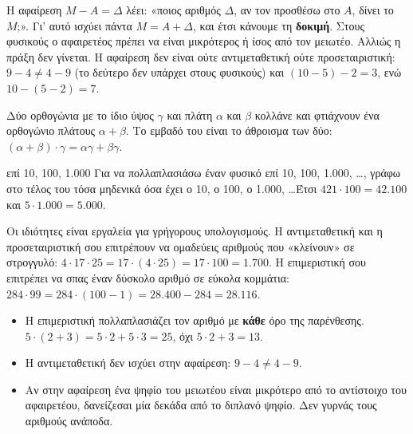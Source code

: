 
Η αφαίρεση $Μ-Α=\Delta$ λέει: «ποιος αριθμός $\Delta$, αν τον προσθέσω στο $Α$, δίνει το $Μ$;». Γι' αυτό ισχύει πάντα $Μ=Α+\Delta$, και έτσι κάνουμε τη \textbf{δοκιμή}. Στους φυσικούς ο αφαιρετέος πρέπει να είναι μικρότερος ή ίσος από τον μειωτέο. Αλλιώς η πράξη δεν γίνεται. Η αφαίρεση δεν είναι ούτε αντιμεταθετική ούτε προσεταιριστική: $9-4\neq 4-9$ (το δεύτερο δεν υπάρχει στους φυσικούς) και $(10-5)-2=3$, ενώ $10-(5-2)=7$.


Δύο ορθογώνια με το ίδιο ύψος $\gamma$ και πλάτη $\alpha$ και $\beta$ κολλάνε και φτιάχνουν ένα ορθογώνιο πλάτους $\alpha+\beta$. Το εμβαδό του είναι το άθροισμα των δύο: $(\alpha+\beta)\cdot\gamma=\alpha\gamma+\beta\gamma$.

\begin{center}
\end{center}


\begin{kanonas}{επί 10, 100, 1.000}
Για να πολλαπλασιάσω έναν φυσικό επί 10, 100, 1.000, \dots, γράφω στο τέλος του τόσα μηδενικά όσα έχει ο 10, ο 100, ο 1.000, \dots Έτσι $421\cdot 100=42.100$ και $5\cdot 1.000=5.000$.
\end{kanonas}


Οι ιδιότητες είναι εργαλεία για γρήγορους υπολογισμούς. Η αντιμεταθετική και η προσεταιριστική σου επιτρέπουν να ομαδεύεις αριθμούς που «κλείνουν» σε στρογγυλό: $4\cdot 17\cdot 25=17\cdot(4\cdot 25)=17\cdot 100=1.700$. Η επιμεριστική σου επιτρέπει να σπας έναν δύσκολο αριθμό σε εύκολα κομμάτια: $284\cdot 99=284\cdot(100-1)=28.400-284=28.116$.

\begin{prosoxi}
\begin{itemize}[leftmargin=1.2em,itemsep=0.3ex,topsep=2pt]
\item Η επιμεριστική πολλαπλασιάζει τον αριθμό με \textbf{κάθε} όρο της παρένθεσης. $5\cdot(2+3)=5\cdot 2+5\cdot 3=25$, όχι $5\cdot 2+3=13$.
\item Η αντιμεταθετική δεν ισχύει στην αφαίρεση: $9-4\neq 4-9$.
\item Αν στην αφαίρεση ένα ψηφίο του μειωτέου είναι μικρότερο από το αντίστοιχο του αφαιρετέου, δανείζεσαι μία δεκάδα από το διπλανό ψηφίο. Δεν γυρνάς τους αριθμούς ανάποδα.
\end{itemize}
\end{prosoxi}

